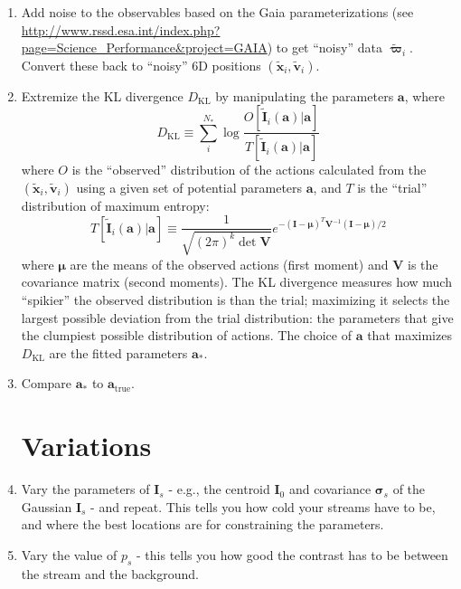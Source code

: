 \documentclass[useAMS,usenatbib,a4paper,referee]{mn2e}
\newcommand{\sub}[2]{\ensuremath{#1_{\mathrm{#2}}}}
\begin{document}
\begin{enumerate}
\item Add noise to the observables based on the Gaia parameterizations (see\\ \url{http://www.rssd.esa.int/index.php?page=Science_Performance&project=GAIA}) to get ``noisy'' data $\tilde{\mathbf{\varpi}}_i$. Convert these back to ``noisy'' 6D positions $(\tilde{\mathbf{x}}_i,\tilde{\mathbf{v}}_i)$.

\item Extremize the KL divergence $\sub{D}{KL}$ by manipulating the parameters $\mathbf{a}$, where 
\begin{equation}
\sub{D}{KL} \equiv \sum_i^{N_*} \log \frac{O[\tilde{\mathbf{I}}_i(\mathbf{a})|\mathbf{a}]}{T[\tilde{\mathbf{I}}_i(\mathbf{a})|\mathbf{a}]}
\end{equation} 
where $O$ is the ``observed'' distribution of the actions calculated from the $(\tilde{\mathbf{x}}_i,\tilde{\mathbf{v}}_i)$ using a given set of potential parameters $\mathbf{a}$, and $T$ is the ``trial'' distribution of maximum entropy:
\begin{equation}
 T[\tilde{\mathbf{I}}_i(\mathbf{a})|\mathbf{a}] \equiv \frac{1}{\sqrt{(2 \pi)^k \det \mathbf{V}}} e^{-(\mathbf{I}-\mathbf{\mu})^T \mathbf{V}^{-1} (\mathbf{I}-\mathbf{\mu})/2}
\end{equation} 
where $\mathbf{\mu}$ are the means of the observed actions (first moment) and $\mathbf{V}$ is the covariance matrix (second moments). The KL divergence measures how much ``spikier'' the observed distribution is than the trial; maximizing it selects the largest possible deviation from the trial distribution: the parameters that give the clumpiest possible distribution of actions. The choice of $\mathbf{a}$ that maximizes $\sub{D}{KL}$ are the fitted parameters $\mathbf{a}_*$.

\item Compare $\mathbf{a}_*$ to $\sub{\mathbf{a}}{true}$.

\section{Variations}
\label{sec:vars}

\item Vary the parameters of $\mathbf{I}_s$ - e.g., the centroid $\mathbf{I}_0$ and covariance $\mathbf{\sigma}_s$ of the Gaussian $\mathbf{I}_s$ - and repeat. This tells you how cold your streams have to be, and where the best locations are for constraining the parameters.  

\item Vary the value of $p_s$ - this tells you how good the contrast has to be between the stream and the background.  


\end{enumerate}
\end{document}
